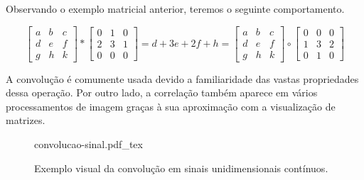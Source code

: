 Observando o exemplo matricial anterior, teremos o seguinte comportamento.

\begin{equation} \label{eq:corrconv}
    \begin{bmatrix}
        a & b & c \\
        d & e & f \\
        g & h & k
    \end{bmatrix} \ast \begin{bmatrix}
        0 & 1 & 0 \\
        2 & 3 & 1 \\
        0 & 0 & 0
    \end{bmatrix}
    = d + 3e + 2f + h =
    \begin{bmatrix}
        a & b & c \\
        d & e & f \\
        g & h & k
    \end{bmatrix} \circ \begin{bmatrix}
        0 & 0 & 0 \\
        1 & 3 & 2 \\
        0 & 1 & 0
    \end{bmatrix}
\end{equation}

A convolução é comumente usada devido a familiaridade das vastas propriedades dessa operação. Por outro lado, a correlação também aparece em vários processamentos de imagem graças à sua aproximação com a visualização de matrizes.

\begin{figure}[H]
    \centering
    \def\svgwidth{12cm}
    {convolucao-sinal.pdf_tex}

    \caption{Exemplo visual da convolução em sinais unidimensionais contínuos.}
    \label{fig:convolucao-sinal}
\end{figure}
